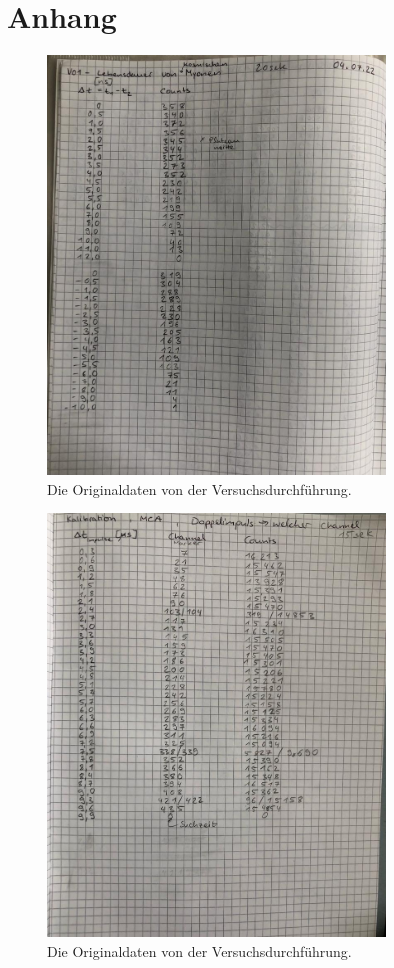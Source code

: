 \newpage
\section{Anhang}
\label{sec:anhang}

\begin{figure}
    \centering
    \includegraphics[width=0.8\textwidth]{bilder/Anlage1.jpeg}
    \caption{Die Originaldaten von der Versuchsdurchführung.}
    \label{fig:originaldaten1}
\end{figure}

\begin{figure}
    \centering
    \includegraphics[width=0.8\textwidth]{bilder/Anlage2.jpeg}
    \caption{Die Originaldaten von der Versuchsdurchführung.}
    \label{fig:originaldaten2}
\end{figure}